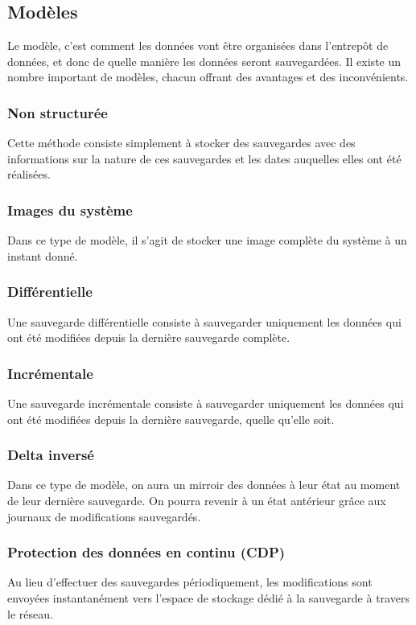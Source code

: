 \documentclass[a4paper,11pt]{report}
\begin{document}
\subsection{Modèles}
Le modèle, c'est comment les données vont être organisées dans l'entrepôt de données, et donc de quelle manière les données seront sauvegardées. 
Il existe un nombre important de modèles, chacun offrant des avantages et des inconvénients.

\subsubsection{Non structurée}
Cette méthode consiste simplement à stocker des sauvegardes avec des informations sur la nature de ces sauvegardes et les dates auquelles elles ont été réalisées.

\subsubsection{Images du système}
Dans ce type de modèle, il s'agit de stocker une image complète du système à un instant donné.

\subsubsection{Différentielle}
Une sauvegarde différentielle consiste à sauvegarder uniquement les données qui ont été modifiées depuis la dernière sauvegarde complète.

\subsubsection{Incrémentale}
Une sauvegarde incrémentale consiste à sauvegarder uniquement les données qui ont été modifiées depuis la dernière sauvegarde, quelle qu'elle soit.

\subsubsection{Delta inversé}
Dans ce type de modèle, on aura un mirroir des données à leur état au moment de leur dernière sauvegarde.
On pourra revenir à un état antérieur grâce aux journaux de modifications sauvegardés.

\subsubsection{Protection des données en continu (CDP)}
Au lieu d'effectuer des sauvegardes périodiquement, les modifications sont envoyées instantanément vers l'espace de stockage dédié à la sauvegarde à travers le réseau.
\end{document}
